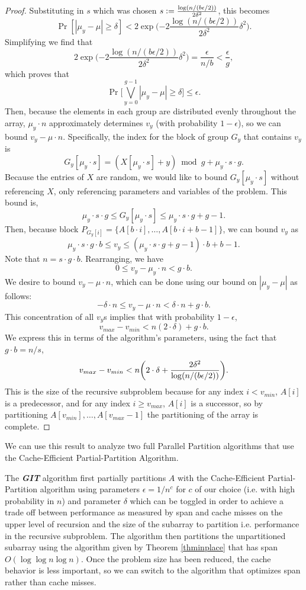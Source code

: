 \documentclass[sigconf]{acmart}
\newcommand{\defeq}{\vcentcolon=}
\DeclarePairedDelimiter{\paren}{(}{)}
\newcommand{\defn}[1]       {{\textit{\textbf{\boldmath #1}}}}
\theoremstyle{remark}
\theoremstyle{remark}
\begin{document}
\begin{proof}
	Substituting in $s$ which was chosen $s\defeq \frac{\log (n/(b\epsilon/2))}{2\delta^2}$, this becomes
	$$\Pr[|\mu_y - \mu| \geq \delta] < 2\exp\Big({-2} \frac{\log (n/(b\epsilon/2))}{2\delta^2} \delta^2\Big). $$
	Simplifying we find that  
	$$2\exp\Big({-2} \frac{\log (n/(b\epsilon/2))}{2\delta^2} \delta^2\Big) = \frac{\epsilon}{n/b} < \frac{\epsilon}{g},$$
	which proves that 
	$$\Pr\Big[\bigvee_{y=0}^{g-1} |\mu_y - \mu| \geq \delta\Big] \leq \epsilon.$$
	Then, because the elements in each group are distributed evenly throughout the array, $\mu_y\cdot n$ approximately determines $v_y$ (with probability $1-\epsilon$), so we can bound $v_y-\mu\cdot n$. 
	Specifically, the index for the block of group $G_y$ that contains $v_y$ is $$G_y[\mu_y\cdot s]= (X[\mu_y \cdot s] + y) \bmod g + \mu_y \cdot s\cdot g.$$
	Because the entries of $X$ are random, we would like to bound $G_y[\mu_y\cdot s]$ without referencing $X$, only referencing parameters and variables of the problem.
	This bound is, 
	$$ \mu_y \cdot s\cdot g \leq G_y[\mu_y\cdot s] \leq  \mu_y \cdot s\cdot g + g-1.$$
	Then, because block $P_{G_y[i]} = \{A[b\cdot i], \ldots, A[b\cdot i + b-1]\}$, we can bound $v_y$ as $$\mu_y\cdot s\cdot g\cdot b \leq v_y \leq (\mu_y \cdot s\cdot g + g-1)\cdot b + b-1.$$
	Note that $n=s\cdot g\cdot b$. 
	Rearranging, we have 
	$$0 \leq v_y- \mu_y\cdot n < g\cdot b.$$
	We desire to bound $v_y-\mu\cdot n$, which can be done using our bound on $|\mu_y - \mu|$ as follows:
	$$ - \delta\cdot n \leq v_y - \mu\cdot n < \delta\cdot n + g\cdot b.$$
	This concentration of all $v_y$s implies that with probability $1-\epsilon$, 
	$$v_{max}-v_{min}<n(2\cdot\delta) + g\cdot b.$$ 
	We express this in terms of the algorithm's parameters, using the fact that $g\cdot b = n/s$, 
	$$v_{max}-v_{min}<n\paren*{2\cdot\delta + \frac{2\delta^2}{\log (n/(b\epsilon/2))}}.$$ 
	This is the size of the recursive subproblem because for any index $i < v_{min}$, $A[i]$ is a predecessor, and for any index $i \geq v_{max}$, $A[i]$ is a successor, so by partitioning $A[v_{min}], \ldots, A[v_{max}-1]$ the partitioning of the array is complete.
\end{proof}
We can use this result to analyze two full Parallel Partition algorithms that use the Cache-Efficient Partial-Partition Algorithm.


The \defn{GIT} algorithm first partially partitions $A$ with the Cache-Efficient Partial-Partition algorithm using parameters $\epsilon = 1/n^c$ for $c$ of our choice (i.e. with high probability in $n$) and parameter $\delta $ which can be toggled in order to achieve a trade off between performance as measured by span and cache misses on the upper level of recursion and the size of the subarray to partition i.e. performance in the recursive subproblem.
The algorithm then partitions the unpartitioned subarray using the algorithm given by Theorem \ref{thminplace} that has span $O(\log\log n \log n)$.
Once the problem size has been reduced, the cache behavior is less important, so we can switch to the algorithm that optimizes span rather than cache misses.
\end{document}
